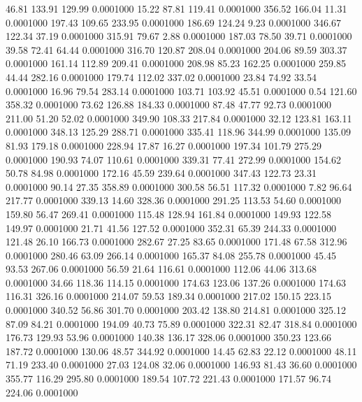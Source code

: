   46.81  133.91  129.99   0.0001000
  15.22   87.81  119.41   0.0001000
 356.52  166.04   11.31   0.0001000
 197.43  109.65  233.95   0.0001000
 186.69  124.24    9.23   0.0001000
 346.67  122.34   37.19   0.0001000
 315.91   79.67    2.88   0.0001000
 187.03   78.50   39.71   0.0001000
  39.58   72.41   64.44   0.0001000
 316.70  120.87  208.04   0.0001000
 204.06   89.59  303.37   0.0001000
 161.14  112.89  209.41   0.0001000
 208.98   85.23  162.25   0.0001000
 259.85   44.44  282.16   0.0001000
 179.74  112.02  337.02   0.0001000
  23.84   74.92   33.54   0.0001000
  16.96   79.54  283.14   0.0001000
 103.71  103.92   45.51   0.0001000
   0.54  121.60  358.32   0.0001000
  73.62  126.88  184.33   0.0001000
  87.48   47.77   92.73   0.0001000
 211.00   51.20   52.02   0.0001000
 349.90  108.33  217.84   0.0001000
  32.12  123.81  163.11   0.0001000
 348.13  125.29  288.71   0.0001000
 335.41  118.96  344.99   0.0001000
 135.09   81.93  179.18   0.0001000
 228.94   17.87   16.27   0.0001000
 197.34  101.79  275.29   0.0001000
 190.93   74.07  110.61   0.0001000
 339.31   77.41  272.99   0.0001000
 154.62   50.78   84.98   0.0001000
 172.16   45.59  239.64   0.0001000
 347.43  122.73   23.31   0.0001000
  90.14   27.35  358.89   0.0001000
 300.58   56.51  117.32   0.0001000
   7.82   96.64  217.77   0.0001000
 339.13   14.60  328.36   0.0001000
 291.25  113.53   54.60   0.0001000
 159.80   56.47  269.41   0.0001000
 115.48  128.94  161.84   0.0001000
 149.93  122.58  149.97   0.0001000
  21.71   41.56  127.52   0.0001000
 352.31   65.39  244.33   0.0001000
 121.48   26.10  166.73   0.0001000
 282.67   27.25   83.65   0.0001000
 171.48   67.58  312.96   0.0001000
 280.46   63.09  266.14   0.0001000
 165.37   84.08  255.78   0.0001000
  45.45   93.53  267.06   0.0001000
  56.59   21.64  116.61   0.0001000
 112.06   44.06  313.68   0.0001000
  34.66  118.36  114.15   0.0001000
 174.63  123.06  137.26   0.0001000
 174.63  116.31  326.16   0.0001000
 214.07   59.53  189.34   0.0001000
 217.02  150.15  223.15   0.0001000
 340.52   56.86  301.70   0.0001000
 203.42  138.80  214.81   0.0001000
 325.12   87.09   84.21   0.0001000
 194.09   40.73   75.89   0.0001000
 322.31   82.47  318.84   0.0001000
 176.73  129.93   53.96   0.0001000
 140.38  136.17  328.06   0.0001000
 350.23  123.66  187.72   0.0001000
 130.06   48.57  344.92   0.0001000
  14.45   62.83   22.12   0.0001000
  48.11   71.19  233.40   0.0001000
  27.03  124.08   32.06   0.0001000
 146.93   81.43   36.60   0.0001000
 355.77  116.29  295.80   0.0001000
 189.54  107.72  221.43   0.0001000
 171.57   96.74  224.06   0.0001000

